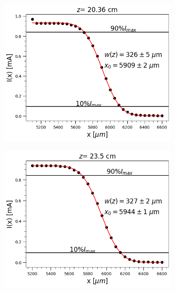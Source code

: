 \documentclass[10pt,letterpaper,twocolumn]{article}
\begin{document}
\begin{figure}[H]	
\centering
\begin{subfigure}[t]{0.45\linewidth}
	\includegraphics[width=\linewidth]{figures/0_2036_fit.png}
\end{subfigure}
\begin{subfigure}[t]{0.45\linewidth}
	\includegraphics[width=\linewidth]{figures/0_2350_fit.png}
\end{subfigure}
~
\begin{subfigure}[t]{0.6\linewidth}

\end{subfigure}
\end{figure}
\end{document}
